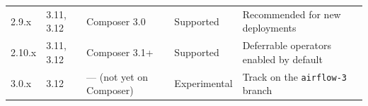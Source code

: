 \documentclass[
  11pt,
  british,
  oneside]{book}
\begin{document}
\begin{longtable}[]{@{}lllll@{}}
\begin{minipage}[t]{0.17\columnwidth}\raggedright
2.9.x\strut
\end{minipage} & \begin{minipage}[t]{0.17\columnwidth}\raggedright
3.11, 3.12\strut
\end{minipage} & \begin{minipage}[t]{0.17\columnwidth}\raggedright
Composer 3.0\strut
\end{minipage} & \begin{minipage}[t]{0.17\columnwidth}\raggedright
Supported\strut
\end{minipage} & \begin{minipage}[t]{0.17\columnwidth}\raggedright
Recommended for new deployments\strut
\end{minipage}\tabularnewline
\begin{minipage}[t]{0.17\columnwidth}\raggedright
2.10.x\strut
\end{minipage} & \begin{minipage}[t]{0.17\columnwidth}\raggedright
3.11, 3.12\strut
\end{minipage} & \begin{minipage}[t]{0.17\columnwidth}\raggedright
Composer 3.1+\strut
\end{minipage} & \begin{minipage}[t]{0.17\columnwidth}\raggedright
Supported\strut
\end{minipage} & \begin{minipage}[t]{0.17\columnwidth}\raggedright
Deferrable operators enabled by default\strut
\end{minipage}\tabularnewline
\begin{minipage}[t]{0.17\columnwidth}\raggedright
3.0.x\strut
\end{minipage} & \begin{minipage}[t]{0.17\columnwidth}\raggedright
3.12\strut
\end{minipage} & \begin{minipage}[t]{0.17\columnwidth}\raggedright
--- (not yet on Composer)\strut
\end{minipage} & \begin{minipage}[t]{0.17\columnwidth}\raggedright
Experimental\strut
\end{minipage} & \begin{minipage}[t]{0.17\columnwidth}\raggedright
Track on the \texttt{airflow-3} branch\strut
\end{minipage}\tabularnewline
\bottomrule
\end{longtable}
\end{document}
